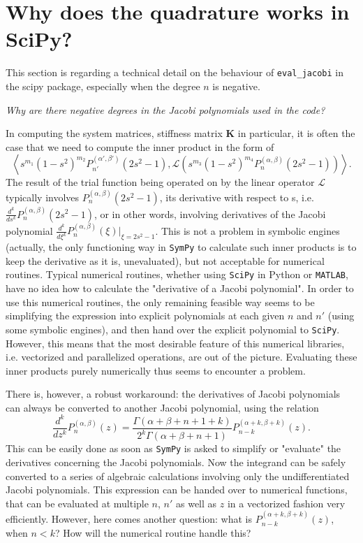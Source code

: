 
\section{Why does the quadrature works in SciPy?}

This section is regarding a technical detail on the behaviour of \texttt{eval\_jacobi} in the scipy package, especially when the degree $n$ is negative.
\vspace{1em}

\noindent \textit{Why are there negative degrees in the Jacobi polynomials used in the code?}

In computing the system matrices, stiffness matrix $\mathbf{K}$ in particular, it is often the case that we need to compute the inner product in the form of
\[
    \left\langle s^{m_1}(1-s^2)^{m_2}P_{n'}^{(\alpha', \beta')}(2s^2 - 1), \mathcal{L} \left(s^{m_3}(1-s^2)^{m_4}P_n^{(\alpha, \beta)}(2s^2 - 1)\right) \right\rangle.
\]
The result of the trial function being operated on by the linear operator $\mathcal{L}$ typically involves $P_n^{(\alpha, \beta)}(2s^2-1)$, its derivative with respect to s, i.e. $\frac{d^k}{ds^k} P_n^{(\alpha,\beta)}(2s^2 - 1)$, or in other words, involving derivatives of the Jacobi polynomial $\frac{d^k}{d\xi^k} P_n^{(\alpha, \beta)}(\xi)|_{\xi = 2s^2 - 1}$.
This is not a problem in symbolic engines (actually, the only functioning way in \texttt{SymPy} to calculate such inner products is to keep the derivative as it is, unevaluated), but not acceptable for numerical routines. Typical numerical routines, whether using \texttt{SciPy} in Python or \texttt{MATLAB}, have no idea how to calculate the "derivative of a Jacobi polynomial".
In order to use this numerical routines, the only remaining feasible way seems to be simplifying the expression into explicit polynomials at each given $n$ and $n'$ (using some symbolic engines), and then hand over the explicit polynomial to \texttt{SciPy}.
However, this means that the most desirable feature of this numerical libraries, i.e. vectorized and parallelized operations, are out of the picture.
Evaluating these inner products purely numerically thus seems to encounter a problem.

There is, however, a robust workaround: the derivatives of Jacobi polynomials can always be converted to another Jacobi polynomial, using the relation
\[
    \frac{d^k}{dz^k} P_n^{(\alpha,\beta)}(z) = \frac{\Gamma(\alpha + \beta + n + 1 + k)}{2^k \Gamma(\alpha + \beta + n + 1)} P_{n-k}^{(\alpha+k,\beta+k)}(z).
\]
This can be easily done as soon as \texttt{SymPy} is asked to simplify or "evaluate" the derivatives concerning the Jacobi polynomials.
Now the integrand can be safely converted to a series of algebraic calculations involving only the undifferentiated Jacobi polynomials.
This expression can be handed over to numerical functions, that can be evaluated at multiple $n$, $n'$ as well as $z$ in a vectorized fashion very efficiently. 
However, here comes another question: what is $P_{n-k}^{(\alpha+k,\beta+k)}(z)$, when $n < k$? How will the numerical routine handle this?
\vspace{1em}

